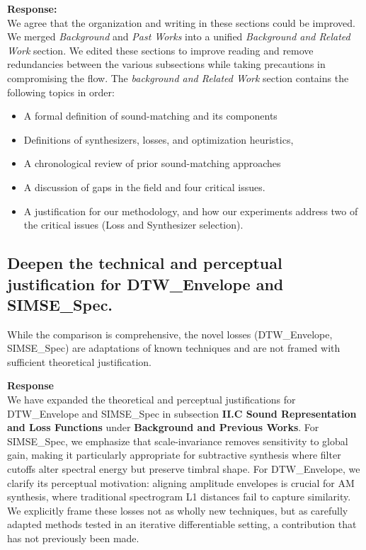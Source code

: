 \documentclass[11pt]{article}
\begin{document}
\noindent\textbf{Response:} \\
We agree that the organization and writing in these sections could be improved. We merged \emph{Background} and \emph{Past Works} into a unified \emph{Background and Related Work} section. We edited these sections to improve reading and remove redundancies between the various subsections while taking precautions in compromising the flow.
The \emph{background and Related Work} section contains the following topics in order:  
\begin{itemize}
  \item A formal definition of sound-matching and its components
  \item Definitions of synthesizers, losses, and optimization heuristics,  
  \item A chronological review of prior sound-matching approaches
  \item A discussion of gaps in the field and four critical issues.
  \item A justification for our methodology, and how our experiments address two of the critical issues (Loss and Synthesizer selection).
\end{itemize}

\subsection*{Deepen the technical and perceptual justification for DTW\_Envelope and SIMSE\_Spec.}
\noindent While the comparison is comprehensive, the novel losses (DTW\_Envelope, SIMSE\_Spec) are adaptations of known techniques and are not framed with sufficient theoretical justification. 

\noindent\textbf{Response} \\
We have expanded the theoretical and perceptual justifications for DTW\_Envelope and SIMSE\_Spec in subsection \textbf{II.C Sound Representation and Loss Functions} under \textbf{Background and Previous Works}. For SIMSE\_Spec, we emphasize that scale-invariance removes sensitivity to global gain, making it particularly appropriate for subtractive synthesis where filter cutoffs alter spectral energy but preserve timbral shape. For DTW\_Envelope, we clarify its perceptual motivation: aligning amplitude envelopes is crucial for AM synthesis, where traditional spectrogram L1 distances fail to capture similarity. We explicitly frame these losses not as wholly new techniques, but as carefully adapted methods tested in an iterative differentiable setting, a contribution that has not previously been made.  
\end{document}
